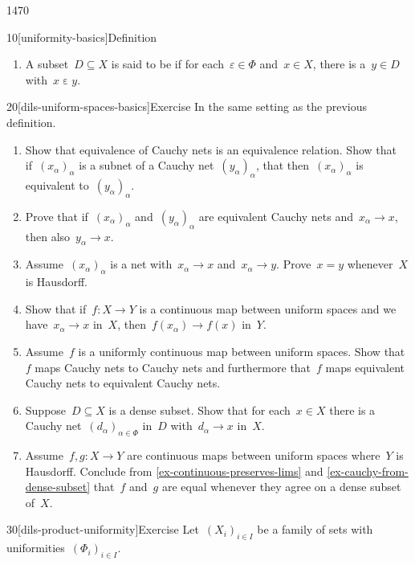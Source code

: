 \begin{parsec}{1470}
\begin{point}{10}[uniformity-basics]{Definition}
\begin{enumerate}
\item
    A subset~$D \subseteq X$ is said to be 
    if for each~$\varepsilon \in \Phi$ and~$x \in X$,
    there is a~$y \in D$
    with~$x \mathrel\varepsilon y$.
\end{enumerate}
\spacingfix{}
\end{point}
\begin{point}{20}[dils-uniform-spaces-basics]{Exercise}%
    In the same setting as the previous definition.
    \begin{enumerate}
\item
    Show that equivalence of Cauchy nets is an equivalence relation.
    Show that if~$(x_\alpha)_\alpha$ is a subnet of
    a Cauchy net~$(y_\alpha)_\alpha$,
        that then~$(x_\alpha)_\alpha$ is equivalent to~$(y_\alpha)_\alpha$.
\item
    Prove that if~$(x_\alpha)_\alpha$ and~$(y_\alpha)_\alpha$
        are equivalent Cauchy nets and~$x_\alpha \to x$,
        then also~$y_\alpha \to x$.
\item
    Assume~$(x_\alpha)_\alpha$ is a net with~$x_\alpha \to x$
        and~$x_\alpha \to y$.  Prove~$x = y$ whenever~$X$ is Hausdorff.
\item\label{ex-continuous-preserves-lims}
    Show that if~$f\colon X \to Y$ is a continuous map
    between uniform spaces
        and we have~$x_\alpha \to x$ in~$X$,
        then~$f(x_\alpha) \to f(x)$ in~$Y$.
\item
    Assume~$f$ is a uniformly continuous map between uniform spaces.
    Show that $f$ maps Cauchy nets to Cauchy nets
    and furthermore that~$f$ maps equivalent Cauchy nets to equivalent
        Cauchy nets.
\item\label{ex-cauchy-from-dense-subset}
    Suppose~$D \subseteq X$ is a dense subset.
    Show that for each~$x \in X$
    there is a Cauchy net~$(d_\alpha)_{\alpha \in \Phi}$
    in~$D$ with~$d_\alpha \to x$ in~$X$.
\item
    Assume~$f,g\colon X \to Y$ are continuous maps between uniform spaces
        where~$Y$ is Hausdorff.
Conclude from \ref{ex-continuous-preserves-lims} and
    \ref{ex-cauchy-from-dense-subset}
    that~$f$ and~$g$ are equal whenever they agree on a dense subset of~$X$.
\end{enumerate}
\spacingfix{}
\end{point}
\begin{point}{30}[dils-product-uniformity]{Exercise}%
    Let~$(X_i)_{i \in I}$ be a family of sets with
        uniformities~$(\Phi_i)_{i \in I}$.

\end{point}
\end{parsec}
